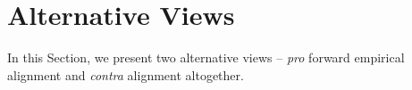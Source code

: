 \documentclass{article}
\theoremstyle{plain}
\theoremstyle{definition}
\theoremstyle{remark}
\begin{document}







\section{Alternative Views}\label{sec:alt-view}

In this Section, we present two alternative views -- \textit{pro} forward empirical alignment and \textit{contra} alignment altogether.
\end{document}
